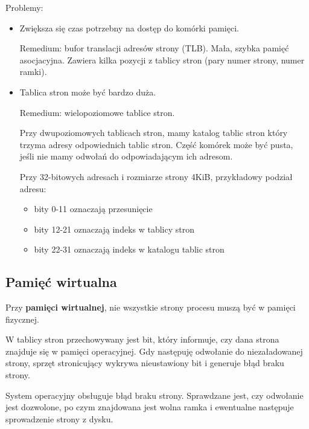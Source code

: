 Problemy:
\begin{itemize}
    \item Zwiększa się czas potrzebny na dostęp do komórki pamięci.

    Remedium: bufor translacji adresów strony (TLB). Mała, szybka pamięć asocjacyjna. Zawiera kilka pozycji z tablicy stron (pary numer strony, numer ramki).
    
    \item Tablica stron może być bardzo duża.

    Remedium: wielopoziomowe tablice stron.
    \begin{example}
        Przy dwupoziomowych tablicach stron, mamy katalog tablic stron który trzyma adresy odpowiednich tablic stron. Część komórek może być pusta, jeśli nie mamy odwołań do odpowiadającym ich adresom.

        Przy 32-bitowych adresach i rozmiarze strony 4KiB, przykładowy podział adresu:
        \begin{itemize}
            \vspace{-3pt} \item bity 0-11 oznaczają przesunięcie
            \vspace{-3pt} \item bity 12-21 oznaczają indeks w tablicy stron
            \vspace{-3pt} \item bity 22-31 oznaczają indeks w katalogu tablic stron
        \end{itemize}
    \end{example}
\end{itemize}

\subsection{Pamięć wirtualna}
Przy \textbf{pamięci wirtualnej}, nie wszystkie strony procesu muszą być w pamięci fizycznej.

W tablicy stron przechowywany jest bit, który informuje, czy dana strona znajduje się w pamięci operacyjnej. 
Gdy następuję odwołanie do niezaładowanej strony, sprzęt stronicujący wykrywa nieustawiony bit i generuje błąd braku strony.

System operacyjny obsługuje błąd braku strony. Sprawdzane jest, czy odwołanie jest dozwolone, po czym znajdowana jest wolna ramka i ewentualne następuje sprowadzenie strony z dysku.

